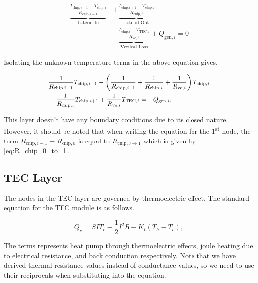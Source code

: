 \documentclass[10pt,a4paper,twocolumn]{article}
\begin{document}
\begin{align*}
	\underbrace{\frac{T_{\text{chip}, i-1} - T_{\text{chip}, i}}{R_{\text{chip}, i-1}}}_{\text{Lateral In}} & + \underbrace{\frac{T_{\text{chip}, i+1} - T_{\text{chip}, i}}{R_{\text{chip}, i}}}_{\text{Lateral Out}} \\ &- \underbrace{\frac{T_{\text{chip}, i} - T_{\text{TEC}, i}}{R_{\text{ve}, i}}}_{\text{Vertical Loss}} + Q_{\text{gen}, i} = 0
\end{align*}

Isolating the unknown temperature terms in the above equation gives,

\begin{equation}
	\small
	\begin{aligned}
		 & \frac{1}{R_{\text{chip}, i-1}} T_{\text{chip}, i-1}-\left(

		\frac{1}{R_{\text{chip}, i-1}} + \frac{1}{R_{\text{chip}, i}} + \frac{1}{R_{\text{ve}, i}}
		\right) T_{\text{chip}, i}                                                                           \\
		 & + \frac{1}{R_{\text{chip}, i}} T_{\text{chip}, i+1}+ \frac{1}{R_{\text{ve}, i}} T_{\text{TEC}, i}

		=- Q_{\text{gen}, i}.
	\end{aligned}
\end{equation}

This layer doesn't have any boundary conditions due to its closed nature. However, it should be noted that when writing the equation for the 1\textsuperscript{st} node, the term $R_{\text{chip},i-1} = R_{\text{chip},0}$ is equal to $R_{\text{chip}, 0\to 1}$ which is given by \cref{eq:R_chip_0_to_1}.

\subsection{TEC Layer}

The nodes in the TEC layer are governed by thermoelectric effect. The standard equation for the TEC module is as follows.

\begin{equation}
	Q_{c}=S I T_{c}-\textstyle{\frac{1}{2}}I^{2}R-K_t\left(T_{h}-T_{c}\right),
	\label{eq:TEC_standard}
\end{equation}

The terms represents heat pump through thermoelectric effects, joule heating due to electrical resistance, and back conduction respectively. Note that we have derived thermal resistance values instead of conductance values, so we need to use their reciprocals when substituting into the equation.
\end{document}
